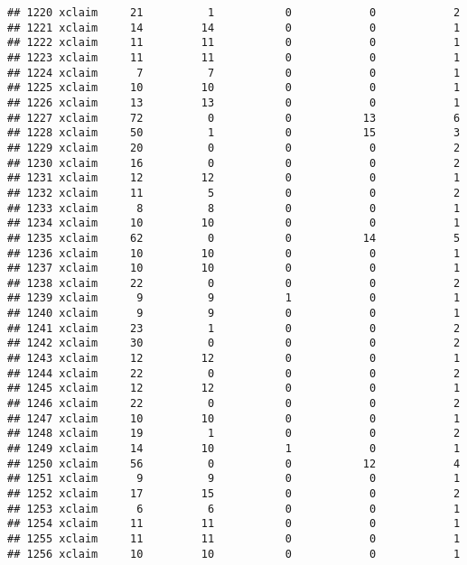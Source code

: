 \documentclass[
]{article}
\begin{document}
\begin{verbatim}
## 1220 xclaim     21          1           0            0            2
## 1221 xclaim     14         14           0            0            1
## 1222 xclaim     11         11           0            0            1
## 1223 xclaim     11         11           0            0            1
## 1224 xclaim      7          7           0            0            1
## 1225 xclaim     10         10           0            0            1
## 1226 xclaim     13         13           0            0            1
## 1227 xclaim     72          0           0           13            6
## 1228 xclaim     50          1           0           15            3
## 1229 xclaim     20          0           0            0            2
## 1230 xclaim     16          0           0            0            2
## 1231 xclaim     12         12           0            0            1
## 1232 xclaim     11          5           0            0            2
## 1233 xclaim      8          8           0            0            1
## 1234 xclaim     10         10           0            0            1
## 1235 xclaim     62          0           0           14            5
## 1236 xclaim     10         10           0            0            1
## 1237 xclaim     10         10           0            0            1
## 1238 xclaim     22          0           0            0            2
## 1239 xclaim      9          9           1            0            1
## 1240 xclaim      9          9           0            0            1
## 1241 xclaim     23          1           0            0            2
## 1242 xclaim     30          0           0            0            2
## 1243 xclaim     12         12           0            0            1
## 1244 xclaim     22          0           0            0            2
## 1245 xclaim     12         12           0            0            1
## 1246 xclaim     22          0           0            0            2
## 1247 xclaim     10         10           0            0            1
## 1248 xclaim     19          1           0            0            2
## 1249 xclaim     14         10           1            0            1
## 1250 xclaim     56          0           0           12            4
## 1251 xclaim      9          9           0            0            1
## 1252 xclaim     17         15           0            0            2
## 1253 xclaim      6          6           0            0            1
## 1254 xclaim     11         11           0            0            1
## 1255 xclaim     11         11           0            0            1
## 1256 xclaim     10         10           0            0            1

\end{verbatim}
\end{document}
